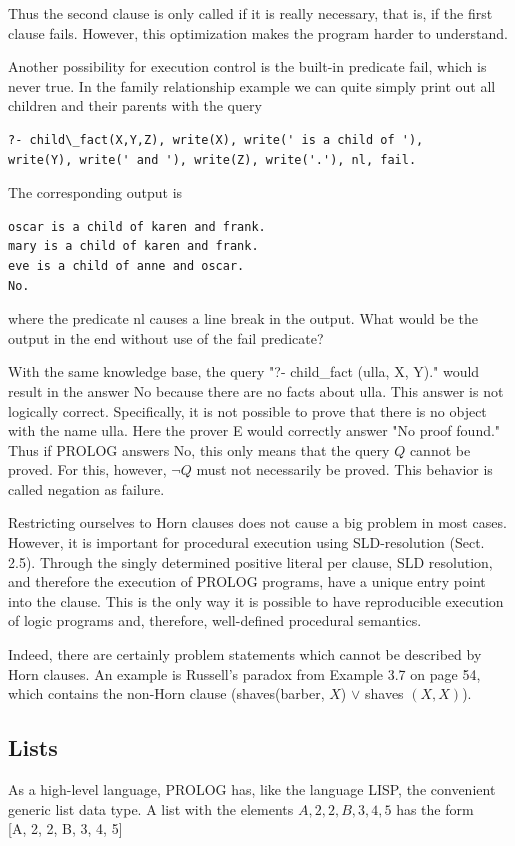 \documentclass[10pt]{book}
\begin{document}
Thus the second clause is only called if it is really necessary, that is, if the first clause fails. However, this optimization makes the program harder to understand.

Another possibility for execution control is the built-in predicate fail, which is never true. In the family relationship example we can quite simply print out all children and their parents with the query

\begin{verbatim}
?- child\_fact(X,Y,Z), write(X), write(' is a child of '),
write(Y), write(' and '), write(Z), write('.'), nl, fail.
\end{verbatim}

The corresponding output is

\begin{verbatim}
oscar is a child of karen and frank.
mary is a child of karen and frank.
eve is a child of anne and oscar.
No.
\end{verbatim}

where the predicate nl causes a line break in the output. What would be the output in the end without use of the fail predicate?

With the same knowledge base, the query "?- child\_fact (ulla, X, Y)." would result in the answer No because there are no facts about ulla. This answer is not logically correct. Specifically, it is not possible to prove that there is no object with the name ulla. Here the prover E would correctly answer "No proof found." Thus if PROLOG answers No, this only means that the query $Q$ cannot be proved. For this, however, $\neg Q$ must not necessarily be proved. This behavior is called negation as failure.

Restricting ourselves to Horn clauses does not cause a big problem in most cases. However, it is important for procedural execution using SLD-resolution (Sect. 2.5). Through the singly determined positive literal per clause, SLD resolution, and therefore the execution of PROLOG programs, have a unique entry point into the clause. This is the only way it is possible to have reproducible execution of logic programs and, therefore, well-defined procedural semantics.

Indeed, there are certainly problem statements which cannot be described by Horn clauses. An example is Russell's paradox from Example 3.7 on page 54, which contains the non-Horn clause (shaves(barber, $X$) $\vee$ shaves $(X, X)$).

\subsection{Lists}
As a high-level language, PROLOG has, like the language LISP, the convenient generic list data type. A list with the elements $A, 2,2, B, 3,4,5$ has the form\\
[A, 2, 2, B, 3, 4, 5]
\end{document}
